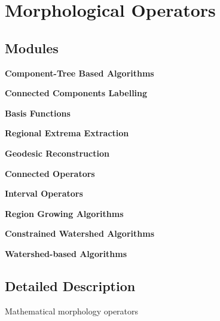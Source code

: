 \section{Morphological Operators}
\label{group__Morpho}
\subsection*{Modules}
\begin{CompactItemize}
\item 
{\bf Component-Tree Based Algorithms}
\item 
{\bf Connected Components Labelling}
\item 
{\bf Basis Functions}
\item 
{\bf Regional Extrema Extraction}
\item 
{\bf Geodesic Reconstruction}
\item 
{\bf Connected Operators}
\item 
{\bf Interval Operators}
\item 
{\bf Region Growing Algorithms}
\item 
{\bf Constrained Watershed Algorithms}
\item 
{\bf Watershed-based Algorithms}
\end{CompactItemize}


\subsection{Detailed Description}
Mathematical morphology operators